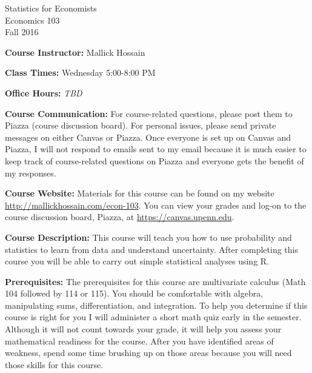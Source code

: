 \documentclass[11pt, letterpaper]{article}
\begin{document}
\thispagestyle{plain}

\begin{center}
\Large
\sc
Statistics for Economists\\
\large
Economics 103\\
\large
Fall 2016
\end{center}


\normalsize
\bigskip
\noindent \textbf{Course Instructor:} Mallick Hossain

\medskip

\noindent \textbf{Class Times:} Wednesday 5:00-8:00 PM

\medskip

\noindent \textbf{Office Hours:} \emph{TBD}

\medskip

\noindent \textbf{Course Communication:} 
For course-related questions, please post them to Piazza (course discussion board). 
For personal issues, please send private messages on either Canvas or Piazza. 
Once everyone is set up on Canvas and Piazza, I will not respond to emails sent to my email because it is much easier to keep track of course-related questions on Piazza and everyone gets the benefit of my responses. 

\medskip
 
\noindent \textbf{Course Website:} Materials for this course can be found on my website \url{http://mallickhossain.com/econ-103}. 
You can view your grades and log-on to the course discussion board, Piazza, at \url{https://canvas.upenn.edu}.

\medskip

\noindent \textbf{Course Description:} 
This course will teach you how to use probability and statistics to learn from data and understand uncertainty. 
After completing this course you will be able to carry out simple statistical analyses using R.

\medskip

\noindent \textbf{Prerequisites:} 
The prerequisites for this course are multivariate calculus (Math 104 followed by 114 or 115). 
You should be comfortable with algebra, manipulating sums, differentiation, and integration. 
To help you determine if this course is right for you I will administer a short math quiz early in the semester. 
Although it will not count towards your grade, it will help you assess your mathematical readiness for the course. 
After you have identified areas of weakness, spend some time brushing up on those areas because you will need those skills for this course.
\end{document}
